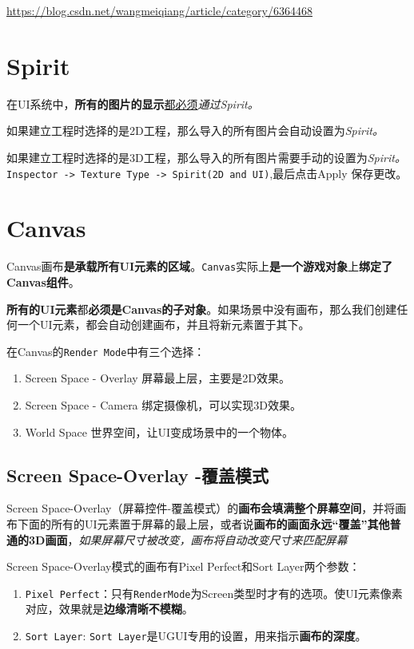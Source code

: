 \documentclass[UTF8,a4paper,12pt]{ctexbook}
\begin{document}
	\url{https://blog.csdn.net/wangmeiqiang/article/category/6364468}
	
	\section{Spirit}
		在UI系统中，\textbf{所有的图片的显示}\underline{都必须}\textit{通过Spirit。}
		
		如果建立工程时选择的是2D工程，那么导入的所有图片会自动设置为\textit{Spirit。}
		
		如果建立工程时选择的是3D工程，那么导入的所有图片需要手动的设置为\textit{Spirit。}\verb|Inspector -> Texture Type -> Spirit(2D and UI)|,最后点击Apply 保存更改。
	
	\section{Canvas}
		Canvas画布\textbf{是承载所有UI元素的区域}。\verb|Canvas|实际上\textbf{是一个游戏对象}上\textbf{绑定了Canvas组件}。
		
		\textbf{所有的UI元素}都\textbf{必须是Canvas的子对象}。如果场景中没有画布，那么我们创建任何一个UI元素，都会自动创建画布，并且将新元素置于其下。
		
		在Canvas的\verb|Render Mode|中有三个选择：
			\begin{enumerate}[itemindent = 1em]
				\item Screen Space - Overlay 屏幕最上层，主要是2D效果。
				\item Screen Space - Camera 绑定摄像机，可以实现3D效果。
				\item World Space 世界空间，让UI变成场景中的一个物体。
			\end{enumerate}
	
		\subsection{Screen Space-Overlay -覆盖模式}
			Screen Space-Overlay（屏幕控件-覆盖模式）的\textbf{画布会填满整个屏幕空间}，并将画布下面的所有的UI元素置于屏幕的最上层，或者说\textbf{画布的画面永远“覆盖”其他普通的3D画面}，\textit{如果屏幕尺寸被改变，画布将自动改变尺寸来匹配屏幕}
			
			Screen Space-Overlay模式的画布有Pixel Perfect和Sort Layer两个参数：
			\begin{enumerate}[itemindent = 1em]
				\item \verb|Pixel Perfect|：只有\verb|RenderMode|为Screen类型时才有的选项。使UI元素像素对应，效果就是\textbf{边缘清晰不模糊}。
				\item \verb|Sort Layer|: \verb|Sort Layer|是UGUI专用的设置，用来指示\textbf{画布的深度}。
			\end{enumerate}
		
\end{document}
